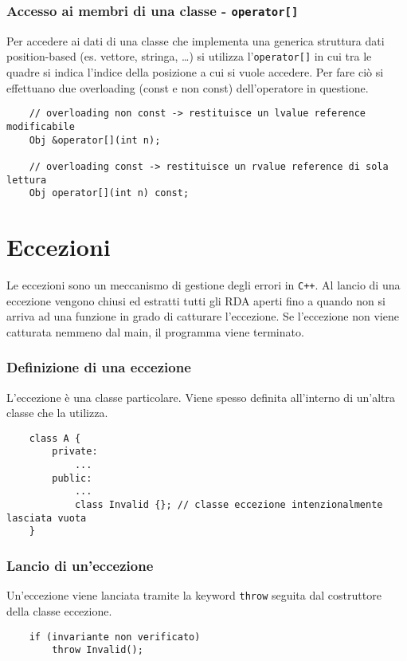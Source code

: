 \documentclass[a4paper]{article}
\begin{document}
\subsubsection*{Accesso ai membri di una classe - \texttt{operator[]}}
Per accedere ai dati di una classe che implementa una generica struttura dati position-based (es. vettore, stringa, \dots) si
utilizza l'\verb|operator[]| in cui tra le quadre si indica l'indice della posizione a cui si vuole accedere. Per fare ciò si
effettuano due overloading (const e non const) dell'operatore in questione.
\begin{lstlisting}
	// overloading non const -> restituisce un lvalue reference modificabile
	Obj &operator[](int n);

	// overloading const -> restituisce un rvalue reference di sola lettura
	Obj operator[](int n) const;
\end{lstlisting}

\newpage

\section{Eccezioni}
Le eccezioni sono un meccanismo di gestione degli errori in \verb|C++|. Al lancio di una eccezione vengono chiusi ed estratti tutti gli
RDA aperti fino a quando non si arriva ad una funzione in grado di catturare l'eccezione. Se l'eccezione non viene catturata
nemmeno dal main, il programma viene terminato.

\subsubsection*{Definizione di una eccezione}
L'eccezione è una classe particolare. Viene spesso definita all'interno di un'altra classe che la utilizza.
\begin{lstlisting}
	class A {
		private:
			...
		public:
			...
			class Invalid {}; // classe eccezione intenzionalmente lasciata vuota
	}
\end{lstlisting}

\subsubsection*{Lancio di un'eccezione}
Un'eccezione viene lanciata tramite la keyword \verb|throw| seguita dal costruttore della classe eccezione.
\begin{lstlisting}
	if (invariante non verificato)
		throw Invalid();
\end{lstlisting}
\end{document}
